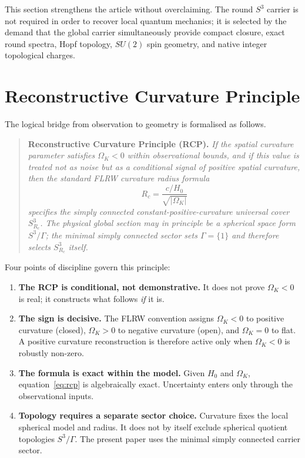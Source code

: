 \documentclass[aps,prd,onecolumn,superscriptaddress,longbibliography,nofootinbib,notitlepage]{revtex4-2}
\begin{document}
This section strengthens the article without overclaiming. The round $S^3$
carrier is not required in order to recover local quantum mechanics; it is
selected by the demand that the global carrier simultaneously provide compact
closure, exact round spectra, Hopf topology, $SU(2)$ spin geometry, and native
integer topological charges.

\section{Reconstructive Curvature Principle}
\label{sec:rcp}

The logical bridge from observation to geometry is formalised as follows.

\begin{quote}
\textbf{Reconstructive Curvature Principle (RCP).}
\textit{If the spatial curvature parameter satisfies $\Omega_K < 0$ within
observational bounds, and if this value is treated not as noise but as a
conditional signal of positive spatial curvature, then the standard FLRW
curvature radius formula
\begin{equation}
  R_c = \frac{c/H_0}{\sqrt{|\Omega_K|}}
  \label{eq:rcp}
\end{equation}
specifies the simply connected constant-positive-curvature universal cover
$S^3_{R_c}$. The physical global section may in principle be a spherical space
form $S^3/\Gamma$; the minimal simply connected sector sets $\Gamma=\{1\}$ and
therefore selects $S^3_{R_c}$ itself.}
\end{quote}

Four points of discipline govern this principle:

\begin{enumerate}
\item \textbf{The RCP is conditional, not demonstrative.}
  It does not prove $\Omega_K < 0$ is real; it constructs what follows
  \emph{if} it is.

\item \textbf{The sign is decisive.}
  The FLRW convention assigns $\Omega_K < 0$ to positive curvature (closed),
  $\Omega_K > 0$ to negative curvature (open), and $\Omega_K = 0$ to flat.
  A positive curvature reconstruction is therefore active only when
  $\Omega_K < 0$ is robustly non-zero.

\item \textbf{The formula is exact within the model.}
  Given $H_0$ and $\Omega_K$, equation~\eqref{eq:rcp} is algebraically exact.
  Uncertainty enters only through the observational inputs.

\item \textbf{Topology requires a separate sector choice.}
  Curvature fixes the local spherical model and radius. It does not by itself
  exclude spherical quotient topologies $S^3/\Gamma$. The present paper uses the
  minimal simply connected carrier sector.
\end{enumerate}
\end{document}
